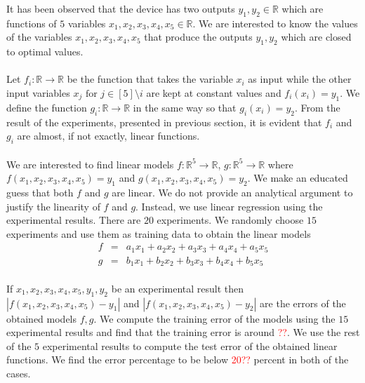\documentclass[12pt]{article}
\begin{document}
\maketitle

It has been observed that the device has two outputs $y_1,y_2 \in \mathbb{R}$ which are functions of $5$ variables $x_1,x_2,x_3,x_4,x_5 \in \mathbb{R}$. We are interested to know the values of the variables  $x_1,x_2,x_3,x_4,x_5$ that produce the outputs $y_1,y_2$ which are closed to optimal values.
\paragraph{}
Let $f_i:\mathbb{R} \rightarrow \mathbb{R}$ be the function that takes the variable $x_i$ as input while the other input variables $x_{j} \text{ for } j \in [5]\setminus{i}$ are kept at constant values and $f_i(x_i) = y_1$. We define the function $g_i:\mathbb{R} \rightarrow \mathbb{R}$ in the same way so that $g_i(x_i) = y_2$. From the result of the experiments, presented in previous section, it is evident that $f_i$ and  $g_i$ are almost, if not exactly, linear functions.
\paragraph{}
We are interested to find linear models $f:\mathbb{R}^5 \rightarrow \mathbb{R}$, $g:\mathbb{R}^5 \rightarrow \mathbb{R}$ where $f(x_1,x_2,x_3,x_4,x_5) = y_1$ and $g(x_1,x_2,x_3,x_4,x_5) = y_2$. We make an educated guess that both $f$ and $g$ are linear. We do not provide an analytical argument to justify the linearity of $f$ and $g$. Instead, we use linear regression using the experimental results. There are $20$ experiments. We randomly choose $15$ experiments and use them as training data to obtain the linear models
\begin{eqnarray*}
f &=& a_1x_1 + a_2x_2 + a_3x_3 + a_4x_4 + a_5x_5\\
g &=& b_1x_1 + b_2x_2 + b_3x_3 + b_4x_4 + b_5x_5
\end{eqnarray*}
\paragraph{}
If $x_1,x_2,x_3,x_4,x_5,y_1,y_2$ be an experimental result then $|f(x_1,x_2,x_3,x_4,x_5)-y_1|$ and $|f(x_1,x_2,x_3,x_4,x_5)-y_2|$ are the errors of the obtained models $f,g$. We compute the training error of the models using the $15$ experimental results and find that the training error is around \textcolor{red}{??}.  We use the rest of the $5$ experimental results to compute the test error of the obtained linear functions. We find the error percentage to be below \textcolor{red}{20??} percent in both of the cases.
\end{document}
